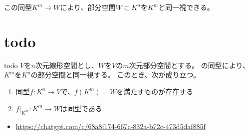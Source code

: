 \documentclass[../../../topic_linear-algebra]{subfiles}
\begin{document}
この同型$K^m \to W$により、部分空間$W \subset K^n$を$K^m$と同一視できる。

\sectionline
\section{todo}

\begin{theorem*}{todo}
  $V$を$n$次元線形空間とし、$W$を$V$の$m$次元部分空間とする。
  の同型により、$K^m$を$K^n$の部分空間と同一視する。
  このとき、次が成り立つ。
  \begin{enumerate}[label=\romanlabel]
    \item 同型$f\colon K^n \to V$で、$f(K^m) = W$を満たすものが存在する
    \item {}$f|_{K^m}\colon K^m \to W$は同型である
  \end{enumerate}
\end{theorem*}

\begin{mindflow}
  \begin{itemize}
    \item \url{https://chatgpt.com/c/68a8f174-667c-832a-b72c-473d5daf885f}
  \end{itemize}
\end{mindflow}
\end{document}
